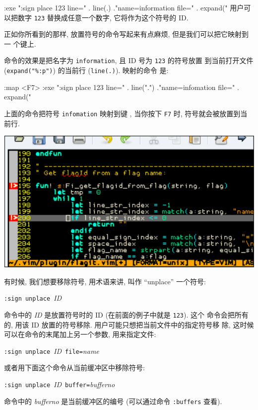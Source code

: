 \begin{vimcode}
:exe ":sign place 123 line=" . line(.) ."name=information file=" .
expand("%
用户可以把数字 \texttt{123} 替换成任意一个数字, 它将作为这个符号的 ID.

正如你所看到的那样, 放置符号的命令写起来有点麻烦, 但是我们可以把它映射到一
个键上.

命令的效果是把名字为 \texttt{information}, 且 ID 号为 \texttt{123} 的符号放置
到当前打开文件 (\verb'expand("%:p")') 的当前行 (\texttt{line(.)}). 映射的命令
是:
\begin{vimcode}
:map <F7> :exe ":sign place 123 line=" . line(".") ."name=infomation
file=" . expand("%
\end{vimcode}
上面的命令把符号 \texttt{infomation} 映射到键 , 当你按下 \texttt{F7}
时, 符号就会被放置到当前行.
\begin{center}
    \includegraphics[scale=0.6]{./images/page69.png}
\end{center}
有时候, 我们想要移除符号, 用术语来讲, 叫作 ``unplace'' 一个符号:
\begin{vimcmdform}
\texttt{:sign unplace}\ \textit{ID}
\end{vimcmdform}

命令中的 \textit{ID} 是放置符号时的 ID (在前面的例子中就是 \texttt{123}). 这个
命令会把所有的, 用该 ID 放置的符号移除. 用户可能只想把当前文件中的指定符号移
除, 这时候可以在命令的末尾加上另一个参数, 用来指定文件:
\begin{vimcmdform}
\texttt{:sign unplace}\ \textit{ID}\ \texttt{file=}\textit{name}
\end{vimcmdform}
或者用下面这个命令从当前缓冲区中移除符号:
\begin{vimcmdform}
\texttt{:sign unplace}\ \textit{ID}\ \texttt{buffer=}\textit{bufferno}
\end{vimcmdform}
命令中的 \textit{bufferno} 是当前缓冲区的编号 (可以通过命令 \texttt{:buffers}
查看).


\end{vimcode}

